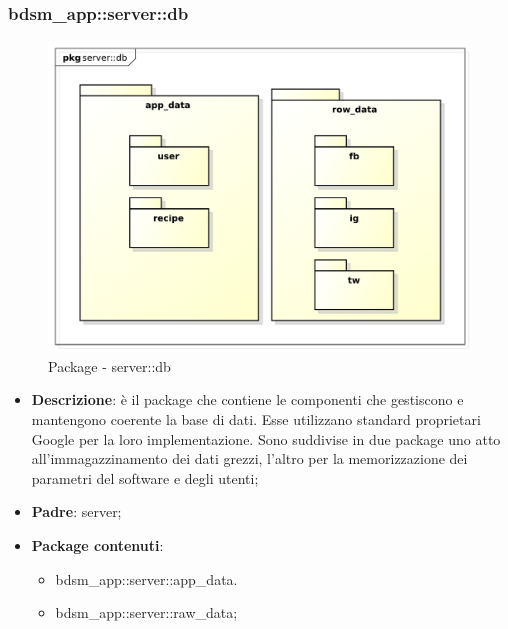 

\subsubsection{bdsm\_app::server::db} %
\label{ssub:bdsm_app_server_db}

	\begin{figure}[htbp]
		\centering
		\centerline{\includegraphics[scale=0.5]{./images/server/db.pdf}}
		\caption{Package - server::db}
	\end{figure}

	\begin{itemize}
		\item \textbf{Descrizione}: è il package che contiene le componenti che gestiscono e mantengono coerente la base di dati. Esse utilizzano standard proprietari Google per la loro implementazione. Sono suddivise in due package uno atto all'immagazzinamento dei dati grezzi, l'altro per la memorizzazione dei parametri del software e degli utenti;
		\item \textbf{Padre}: server;
		\item \textbf{Package contenuti}:
			\begin{itemize}
				\item bdsm\_app::server::app\_data.
				\item bdsm\_app::server::raw\_data;
			\end{itemize}
	\end{itemize}



